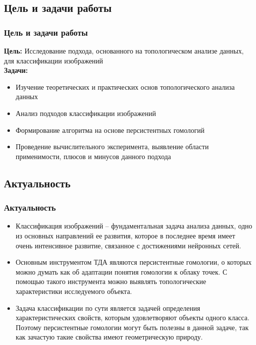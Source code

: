 \documentclass{beamer}
\begin{document}
		\subsection{Цель и задачи работы}
		\begin{frame}
		\frametitle{Цель и задачи работы}
			\textbf{\small Цель:} Исследование подхода, основанного на топологическом анализе данных, для классификации изображений \\[1em]
			\textbf{\small Задачи:}
			\begin{itemize}
				\item Изучение теоретических и практических основ топологического анализа данных
				\item Анализ подходов классификации изображений
				\item Формирование алгоритма на основе персистентных гомологий
				\item Проведение вычислительного эксперимента, выявление области применимости, плюсов и минусов данного подхода
			\end{itemize}
		\end{frame}
		\subsection{Актуальность}	
		\begin{frame}
		\frametitle{Актуальность}
			\begin{itemize}
				\item Классификация изображений -- фундаментальная задача анализа данных, одно из основных направлений ее развития, которое в последнее время имеет очень интенсивное развитие, связанное с достижениями нейронных сетей.
				\item Основным инструментом ТДА являются персистентные гомологии, о которых можно думать как об адаптации понятия гомологии к облаку точек. С помощью такого инструмента можно выявлять топологические характеристики исследуемого объекта.
				\item Задача классификации по сути является задачей определения характеристических свойств, которым удовлетворяют объекты одного класса. Поэтому персистентные гомологии могут быть полезны в данной задаче, так как зачастую такие свойства имеют геометрическую природу.
			\end{itemize}
	\end{frame}
\end{document}
